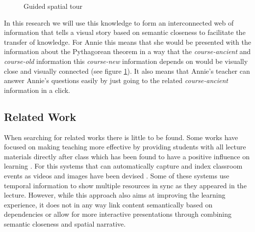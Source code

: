 \documentclass[twoside, 12pt]{article}
\begin{document}
\begin{figure}
\vspace{-26pt}
  \begin{center}
  \end{center}
\vspace{-20pt}
  \caption{Guided spatial tour}
  \label{fig:Annie-guided}
\vspace{-10pt}
\end{figure}

In this research we will use this knowledge to form an interconnected web of information that tells a visual story based on semantic closeness to facilitate the transfer of knowledge. For Annie this means that she would be presented with the information about the Pythagorean theorem in a way that the \textit{course-ancient} and \textit{course-old} information this \textit{course-new} information depends on would be visually close and visually connected (see figure \ref{fig:Annie-guided}). It also means that Annie's teacher can answer Annie's questions easily by just going to the related \textit{course-ancient} information in a click.\\

\subsection{Related Work}
\label{sec:relatedworks}

When searching for related works there is little to be found. Some works have focused on making teaching more effective by providing students with all lecture materials directly after class which has been found to have a positive influence on learning \cite{DBLP:dblp_journals/tochi/BrothertonA04}. For this systems that can automatically capture and index classroom events as videos and images have been devised \cite{indexedclass:npentrel14}. Some of these systems use temporal information \cite{DBLP:dblp_journals/isci/ChungS97} to show multiple resources in sync as they appeared in the lecture. However, while this approach also aims at improving the learning experience, it does not in any way link content semantically based on dependencies or allow for more interactive presentations through combining semantic closeness and spatial narrative.\\
\end{document}
